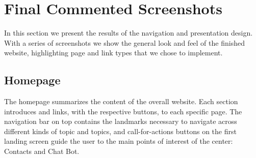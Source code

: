 \pagebreak
\section{Final Commented Screenshots}
In this section we present the results of the navigation and presentation design. With a series of screenshots we show the general look and feel of the finished website, highlighting page and link types that we chose to implement.


\subsection{Homepage}
The homepage summarizes the content of the overall website. Each section introduces and links, with the respective buttons, to each specific page.
The navigation bar on top contains the landmarks necessary to navigate across different kinds of topic and topics, and call-for-actions buttons on the first landing screen
guide the user to the main points of interest of the center: Contacts and Chat Bot.
\vspace{1em}

